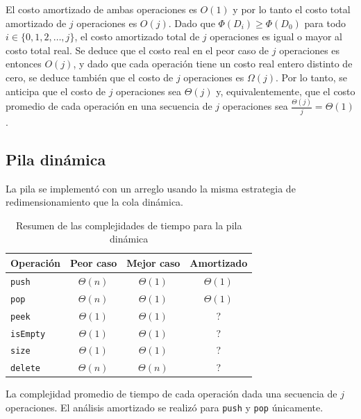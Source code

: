 El costo amortizado de ambas operaciones es $O(1)$ y por lo tanto el costo total amortizado de $j$ operaciones es $O(j)$. Dado que $\Phi{}(D_i) \ge \Phi{}(D_0)$ para todo $i \in \{ 0, 1, 2, \dots{}, j\}$, el costo amortizado total de $j$ operaciones es igual o mayor al costo total real. Se deduce que el costo real en el peor caso de $j$ operaciones es entonces $O(j)$, y dado que cada operación tiene un costo real entero distinto de cero, se deduce también que el costo de $j$ operaciones es $\Omega{}(j)$. Por lo tanto, se anticipa que el costo de $j$ operaciones sea $\Theta{}(j)$ y, equivalentemente, que el costo promedio de cada operación en una secuencia de $j$ operaciones sea $\frac{\Theta{}(j)}{j} = \Theta{}(1)$.

\subsection{Pila dinámica}
\label{sec:stack}

La pila se implementó con un arreglo usando la misma estrategia de redimensionamiento que la cola dinámica.

\begin{table}[htbp]
  \centering{}
  \begin{threeparttable}
    \begin{tabular}{lccc}
      \toprule
      Operación & Peor caso & Mejor caso & Amortizado\tnote{a} \\
      \midrule
      \texttt{push} & $\Theta{} (n)$ & $\Theta{} (1)$ & $\Theta{} (1)$ \\
      \texttt{pop} & $\Theta{} (n)$ & $\Theta{} (1)$ & $\Theta{} (1)$ \\
      \texttt{peek} & $\Theta{} (1)$ & $\Theta{} (1)$ & ? \\
      \texttt{isEmpty} & $\Theta{} (1)$ & $\Theta{} (1)$ & ? \\
      \texttt{size} & $\Theta{} (1)$ & $\Theta{} (1)$ & ? \\
      \texttt{delete} & $\Theta{} (n)$ & $\Theta{} (n)$ & ? \\
      \bottomrule
    \end{tabular}
    \begin{tablenotes}[flushleft]
      \footnotesize
      \item[a] La complejidad promedio de tiempo de cada operación dada una secuencia de $j$ operaciones. El análisis amortizado se realizó para \texttt{push} y \texttt{pop} únicamente.
    \end{tablenotes}
  \end{threeparttable}
  \caption{Resumen de las complejidades de tiempo para la pila dinámica}
  \label{tab:resumen-pila-dinámica}
\end{table}

